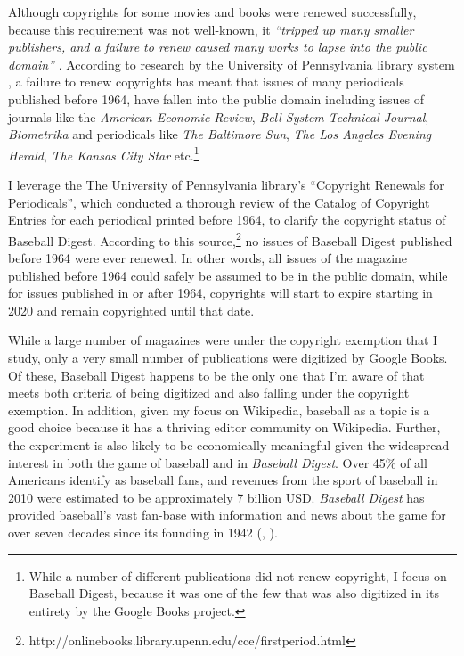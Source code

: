 \documentclass[11pt]{article}
\begin{document}
Although copyrights for some movies and books were renewed successfully, because this requirement was not well-known, it \emph{``tripped up many smaller publishers, and a failure to renew caused many works to lapse into the public domain''} \citep{andrade_copyright_2014}.  According to research by the University of Pennsylvania library system \citep{mark_ockerbloom_next_2006}, a failure to renew copyrights has meant that issues of many periodicals published before 1964, have fallen into the public domain including issues of journals like the \emph{American Economic Review}, \emph{Bell System Technical Journal}, \emph{Biometrika} and periodicals like \emph{The Baltimore Sun}, \emph{The Los Angeles Evening Herald}, \emph{The Kansas City Star} etc.\footnote{While a number of different publications did not renew copyright, I focus on Baseball Digest, because it was one of the few that was also digitized in its entirety by the Google Books project.}

I leverage the The University of Pennsylvania library's ``Copyright Renewals for Periodicals'', which conducted a thorough review of the  Catalog of Copyright Entries for each periodical printed before 1964, to clarify the copyright status of Baseball Digest. According to this source,\footnote{http://onlinebooks.library.upenn.edu/cce/firstperiod.html} no issues of Baseball Digest published before 1964 were ever renewed. In other words, all issues of the magazine published before 1964 could safely be assumed to be in the public domain, while for issues published in or after 1964, copyrights will start to expire starting in 2020 and remain copyrighted until that date.

While a large number of magazines were under the copyright exemption that I study, only a very small number of publications were digitized by Google Books. Of these, Baseball Digest happens to be the only one that I'm aware of that meets both criteria of being digitized and also falling under the copyright exemption. In addition, given my focus on Wikipedia, baseball as a topic is a good choice because it has a thriving editor community on Wikipedia. Further, the experiment is also likely to be economically meaningful given the widespread interest in both the game of baseball and in \emph{Baseball Digest}. Over 45\% of all Americans identify as baseball fans, and revenues from the sport of baseball in 2010 were estimated to be approximately 7 billion USD. \emph{Baseball Digest} has provided baseball's vast fan-base with information and news about the game for over seven decades since its founding in 1942 (\cite{jones_less_2007}, \cite{brown_mlb_2011}).
\end{document}
